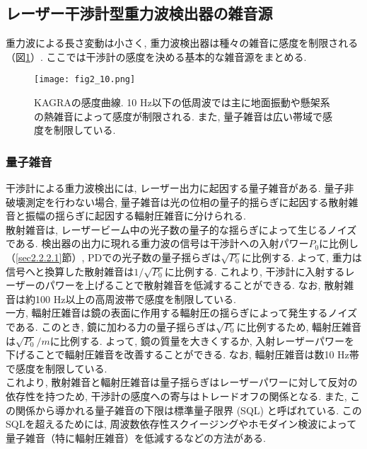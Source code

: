 \subsection{レーザー干渉計型重力波検出器の雑音源}
重力波による長さ変動は小さく, 重力波検出器は種々の雑音に感度を制限される（図\ref{fig2.10}）. ここでは干渉計の感度を決める基本的な雑音源をまとめる. 
\begin{figure}[H]
\begin{center}
\texttt{[image: fig2\_10.png]}
\caption[KAGRAの感度曲線]{KAGRAの感度曲線. 10 Hz以下の低周波では主に地面振動や懸架系の熱雑音によって感度が制限される. また, 量子雑音は広い帯域で感度を制限している. }
\label{fig2.10}
\end{center}
\end{figure}
\subsubsection{量子雑音}
\vskip3mm
干渉計による重力波検出には, レーザー出力に起因する量子雑音がある. 量子非破壊測定を行わない場合, 量子雑音は光の位相の量子的揺らぎに起因する散射雑音と振幅の揺らぎに起因する輻射圧雑音に分けられる. \\
\quad 散射雑音は, レーザービーム中の光子数の量子的な揺らぎによって生じるノイズである. 検出器の出力に現れる重力波の信号は干渉計への入射パワー$P_0$に比例し（\ref{sec2.2.2.1}節）, PDでの光子数の量子揺らぎは$\sqrt{P_0}$に比例する. よって, 重力は信号へと換算した散射雑音は$1/\sqrt{P_0}$に比例する. これより, 干渉計に入射するレーザーのパワーを上げることで散射雑音を低減することができる. なお, 散射雑音は約100 Hz以上の高周波帯で感度を制限している\cite{LIGO}. \\
\quad 一方, 輻射圧雑音は鏡の表面に作用する輻射圧の揺らぎによって発生するノイズである. このとき, 鏡に加わる力の量子揺らぎは$\sqrt{P_0}$に比例するため, 輻射圧雑音は$\sqrt{P_0}/m$に比例する. よって, 鏡の質量を大きくするか, 入射レーザーパワーを下げることで輻射圧雑音を改善することができる. なお, 輻射圧雑音は数10 Hz帯で感度を制限している\cite{LIGO}. \\
\quad これより, 散射雑音と輻射圧雑音は量子揺らぎはレーザーパワーに対して反対の依存性を持つため, 干渉計の感度への寄与はトレードオフの関係となる. また, この関係から導かれる量子雑音の下限は標準量子限界 (SQL) と呼ばれている. このSQLを超えるためには, 周波数依存性スクイージングやホモダイン検波によって量子雑音（特に輻射圧雑音）を低減するなどの方法がある\cite{24}. 
